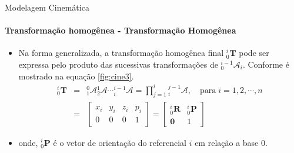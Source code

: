 \documentclass{beamer}
\begin{document}
\begin{frame}{Modelagem Cinemática}
    \framesubtitle{Transformação homogênea - Transformação Homogênea}
    \begin{itemize}
        \item Na forma generalizada, a transformação homogênea final ${}^{i}_0\mathbf{T}$ pode ser expressa pelo produto das sucessivas transformações de ${}^{i-1}_0\mathcal{A}_i$. Conforme é mostrado na equação \eqref{fig:cine3}.
              \begin{equation}\label{fig:cine3}
                  \begin{array}{lcl}
                      {}^i_0\mathbf{T} & = & {}^0_1\mathcal{A}{}^1_2\mathcal{A} \cdots {}^{i-1}_i\mathcal{A} = \prod \limits^i_{j=1}{}^{j-1}_i\mathcal{A}, \quad \mathrm{para\;}i=1,2,\cdots,n \\[.2cm]
                                       & = &
                      \begin{bmatrix}
                          x_i & y_i & z_i & p_i \\
                          0   & 0   & 0   & 1
                      \end{bmatrix} =
                      \begin{bmatrix}
                          {}^i_0\mathbf{R} & {}^i_0\mathbf{P} \\
                          \mathbf{0}       & 1
                      \end{bmatrix}
                  \end{array}
              \end{equation}
        \item onde, ${}^i_0\mathbf{P}$ é o vetor de orientação do referencial $i$ em relação a base $0$.
    \end{itemize}

\end{frame}
\end{document}
